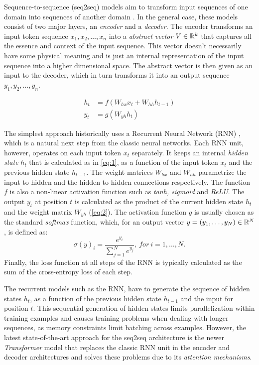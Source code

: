 Sequence-to-sequence (seq2seq) models aim to transform input sequences of one
domain into sequences of another domain \citep{Sutskever_2014}. In the general
case, these models consist of two major layers, an \emph{encoder} and a
\emph{decoder}. The encoder transforms an input token sequence $x_1, x_2, \dots,
x_n$ into a \emph{abstract vector} $V \in \mathbb{R}^k$ that captures all the essence
and context of the input sequence. This vector doesn't necessarily have some
physical meaning and is just an internal representation of the input sequence
into a higher dimensional space. The abstract vector is then given as an input
to the decoder, which in turn transforms it into an output sequence $y_1, y_2,
\dots, y_n$.

\begin{align}
    h_t &= f(W_{hx} x_t + W_{hh} h_{t-1}) \label{eq:1} \\
    y_t &= g(W_{yh} h_t) \label{eq:2}
\end{align}

The simplest approach historically uses a Recurrent Neural Network (RNN)
\citep{Rumelhart1986, Werbos1990, Hochreiter_1997}, which is a natural next step
from the classic neural networks. Each RNN unit, however, operates on each input
token $x_t$ separately. It keeps an internal \emph{hidden state} $h_t$ that is
calculated as in \autoref{eq:1}, as a function of the input token $x_t$ and the
previous hidden state $h_{t-1}$. The weight matrices $W_{hx}$ and $W_{hh}$
parametrize the input-to-hidden and the hidden-to-hidden connections
respectively. The function $f$ is also a non-linear activation function such as
\emph{tanh, sigmoid} and \emph{ReLU}. The output $y_t$ at position $t$ is
calculated as the product of the current hidden state $h_t$ and the weight
matrix $W_{yh}$ (\autoref{eq:2}). The activation function $g$ is usually chosen
as the standard \emph{softmax} function, which, for an output vector $y = (y_1,
\dots, y_N) \in \mathbb{R}^{N}$, is defined as:
\[ \sigma(y)_i = \frac{e^{y_i}}{\sum_{j=1}^{N} e^{y_j}},\ for\ i = 1, \dots, N.
\] Finally, the loss function at all steps of the RNN is typically calculated
as the sum of the cross-entropy loss of each step.

The recurrent models such as the RNN, have to generate the sequence of hidden
states $h_t$, as a function of the previous hidden state $h_{t-1}$ and the input
for position $t$. This sequential generation of hidden states limits
parallelization within training examples and causes training problems when
dealing with longer sequences, as memory constraints limit batching across
examples. However, the latest state-of-the-art approach for the seq2seq
architecture is the newer \emph{Transformer} model \citep{Vaswani_2017} that
replaces the classic RNN unit in the encoder and decoder architectures and
solves these problems due to its \emph{attention mechanisms}.

